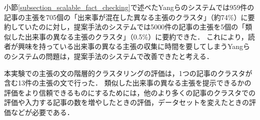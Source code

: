 \documentclass[12pt,a4j,dvipdfmx]{jreport}
\begin{document}
小節\ref{subsection_scalable_fact_checking}で述べたYangらのシステムでは959件の記事の主張を705個の「出来事が混在した異なる主張のクラスタ」（約74\%）に要約していたのに対し，提案手法のシステムでは5000件の記事の主張を5個の「類似した出来事の異なる主張のクラスタ」（0.5\%）に要約できた．
これにより，読者が興味を持っている出来事の異なる主張の収集に時間を要してしまうYangらのシステムの問題は，提案手法のシステムで改善できたと考える．

本実験での主張の文の階層的クラスタリングの評価は，1つの記事のクラスタが含む13件の主張の文で行った．
類似した出来事の異なる主張を提示できるかの評価をより信頼できるものにするためには，他のより多くの記事のクラスタでの評価や入力する記事の数を増やしたときの評価，データセットを変えたときの評価などが必要である．









\end{document}
